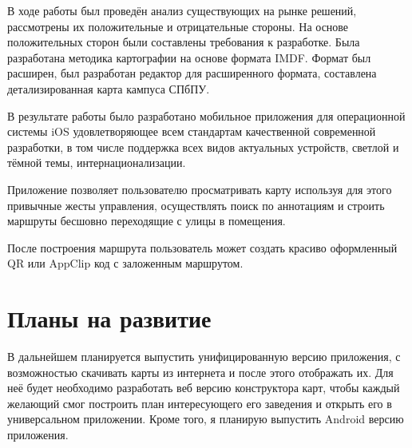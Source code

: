 В ходе работы был проведён анализ существующих на рынке решений, рассмотрены их положительные и отрицательные стороны. На основе положительных сторон были составлены требования к разработке. Была разработана методика картографии на основе формата IMDF. Формат был расширен, был разработан редактор для расширенного формата, составлена детализированная карта кампуса СПбПУ.

В результате работы было разработано мобильное приложения для операционной системы iOS удовлетворяющее всем стандартам качественной современной разработки, в том числе поддержка всех видов актуальных устройств, светлой и тёмной темы, интернационализации.

Приложение позволяет пользователю просматривать карту используя для этого привычные жесты управления, осуществлять поиск по аннотациям и строить маршруты бесшовно переходящие с улицы в помещения.

После построения маршрута пользователь может создать красиво оформленный QR или AppClip код с заложенным маршрутом.


\section{Планы на развитие}
  В дальнейшем планируется выпустить унифицированную версию приложения, с возможностью скачивать карты из интернета и после этого отображать их. Для неё будет необходимо разработать веб версию конструктора карт, чтобы каждый желающий смог построить план интересующего его заведения и открыть его в универсальном приложении. Кроме того, я планирую выпустить Android версию приложения.
